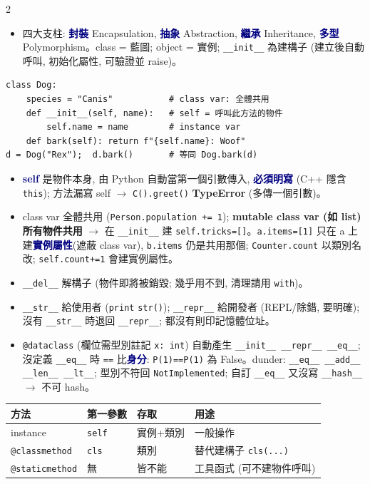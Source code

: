 \documentclass[12pt]{extarticle}
\newcommand{\py}{\lstinline[language={},basicstyle=\ttfamily\fontsize{10.5}{13}\selectfont\bfseries,backgroundcolor=\color{white}]}
\renewcommand{\sec}[1]{\par\vspace{3pt}\noindent{\setlength{\fboxsep}{2pt}\colorbox{navy}{\parbox{\dimexpr\linewidth-4pt}{\color{white}\bfseries\fontsize{13}{16}\selectfont #1}}}\par\vspace{2pt}}
\newcommand{\sub}[1]{\textcolor{navy}{\textbf{#1}}}
\newcommand{\warn}[1]{\textcolor{warn}{\textbf{#1}}}
\newcommand{\ra}{$\rightarrow$}
\newenvironment{bl}{\begin{itemize}[leftmargin=10pt,itemsep=1pt,parsep=0pt,topsep=1pt,partopsep=0pt,labelsep=3pt,label={\textbullet}]}{\end{itemize}}
\begin{document}
\begin{multicols*}{2}
\sec{21. 物件導向 (Lec7)}
\begin{bl}
\item 四大支柱: \sub{封裝} Encapsulation, \sub{抽象} Abstraction, \sub{繼承} Inheritance, \sub{多型} Polymorphism。class = 藍圖; object = 實例; \py|__init__| 為建構子 (建立後自動呼叫, 初始化屬性, 可驗證並 raise)。
\end{bl}
\begin{lstlisting}
class Dog:
    species = "Canis"           # class var: 全體共用
    def __init__(self, name):   # self = 呼叫此方法的物件
        self.name = name        # instance var
    def bark(self): return f"{self.name}: Woof"
d = Dog("Rex");  d.bark()       # 等同 Dog.bark(d)
\end{lstlisting}
\begin{bl}
\item \sub{self} 是物件本身, 由 Python 自動當第一個引數傳入, \sub{必須明寫} (C++ 隱含 \py|this|); 方法漏寫 self \ra{} \py|C().greet()| \warn{TypeError} (多傳一個引數)。
\item class var 全體共用 (\py|Person.population += 1|); \warn{mutable class var (如 list) 所有物件共用} \ra{} 在 \py|__init__| 建 \py|self.tricks=[]|。\py|a.items=[1]| 只在 a 上建\sub{實例屬性}(遮蔽 class var), \py|b.items| 仍是共用那個; \py|Counter.count| 以類別名改; \py|self.count+=1| 會建實例屬性。
\item \py|__del__| 解構子 (物件即將被銷毀; 幾乎用不到, 清理請用 \py|with|)。
\item \py|__str__| 給使用者 (\py|print| \py|str()|); \py|__repr__| 給開發者 (REPL/除錯, 要明確); 沒有 \py|__str__| 時退回 \py|__repr__|; 都沒有則印記憶體位址。
\item \py|@dataclass| (欄位需型別註記 \py|x: int|) 自動產生 \py|__init__ __repr__ __eq__|; 沒定義 \py|__eq__| 時 \py|==| 比\sub{身分}: \py|P(1)==P(1)| 為 False。dunder: \py|__eq__ __add__ __len__ __lt__|; 型別不符回 \py|NotImplemented|; 自訂 \py|__eq__| 又沒寫 \py|__hash__| \ra{} 不可 hash。
\end{bl}
\begin{tabular}{@{}l|l|l|l@{}}
方法 & 第一參數 & 存取 & 用途\\\hline
instance & \py|self| & 實例+類別 & 一般操作\\
\py|@classmethod| & \py|cls| & 類別 & 替代建構子 \py|cls(...)|\\
\py|@staticmethod| & 無 & 皆不能 & 工具函式 (可不建物件呼叫)\\
\end{tabular}
\begin{bl}

\end{bl}
\end{multicols*}
\end{document}
